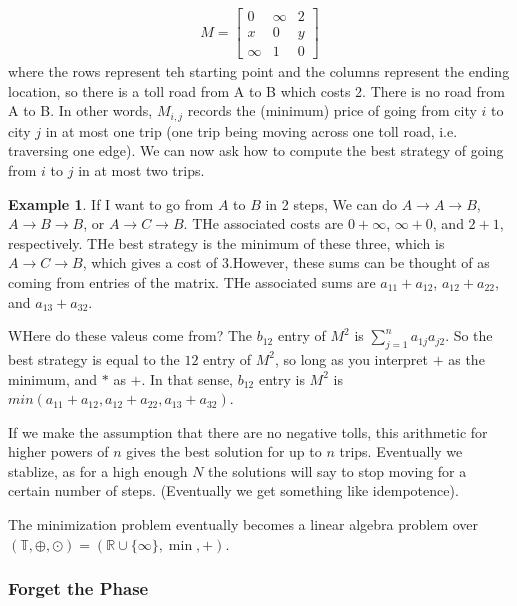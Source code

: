 \documentclass[11pt]{article}
\theoremstyle{definition}
\theoremstyle{plain}%
\theoremstyle{definition}
\newtheorem{protoexample}{Example}[section]
\newenvironment{ex}
   {\colorlet{shadecolor}{red!15}\begin{shaded}\begin{protoexample}}
   {\end{protoexample}\end{shaded}}
\def\RR{{\mathbb R}}
\begin{document}
\begin{align*}
    M= \begin{bmatrix}
        0 & \infty & 2
        \\
        x & 0 & y
        \\
        \infty & 1 & 0
    \end{bmatrix}
\end{align*}
where the rows represent teh starting point and the columns represent the ending location, so there is a toll road from A to B which costs 2. There is no road from A to B. In other words, $M_{i,j}$ records the (minimum) price of going from city $i$ to city $j$ in at most one trip (one trip being moving across one toll road, i.e. traversing one edge). We can now ask how to compute the best strategy of going from $i$ to $j$ in at most two trips.

\begin{ex}
    If I want to go from $A$ to $B$ in 2 steps, We can do $A \rightarrow A \rightarrow B$, $A \rightarrow B \rightarrow B$, or $A \rightarrow C \rightarrow B$. THe associated costs are $0+\infty$, $\infty + 0$, and $2 + 1$, respectively. THe best strategy is the minimum of these three, which is $A \rightarrow C \rightarrow B$, which gives a cost of $3$.However, these sums can be thought of as coming from entries of the matrix. THe associated sums are $a_{11}+a_{12}$, $a_{12}+a_{22}$, and $a_{13}+a_{32}$. 


    WHere do these valeus come from? The $b_{12}$ entry of $M^2$ is $\sum\limits_{j=1}^n a_{1j}a_{j2}$. So the best strategy is equal to the $12$ entry of $M^2$, so long as you interpret $+$ as the minimum, and $*$ as $+$. In that sense, $b_{12}$ entry is $M^2$ is $min(a_{11}+a_{12}, a_{12} +a_{22}, a_{13}+a_{32})$. 



    If we make the assumption that there are no negative tolls, this arithmetic for higher powers of $n$ gives the best solution for up to $n$ trips. Eventually we stablize, as for a high enough $N$ the solutions will say to stop moving for a certain number of steps. (Eventually we get something like idempotence).
\end{ex}


The minimization problem eventually becomes a linear algebra problem over $(\mathbb{T}, \oplus, \odot) = ( \RR \cup \{\infty\}, \min, +)$.


\subsubsection{Forget the Phase}
\end{document}
